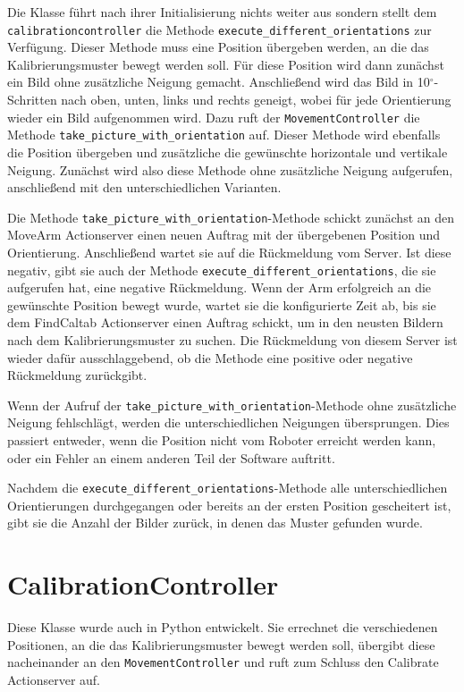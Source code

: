Die Klasse führt nach ihrer Initialisierung nichts weiter aus sondern stellt dem \texttt{calibrationcontroller} die Methode \texttt{execute\_different\_orientations} zur Verfügung. Dieser Methode muss eine Position übergeben werden, an die das Kalibrierungsmuster bewegt werden soll. Für diese Position wird dann zunächst ein Bild ohne zusätzliche Neigung gemacht. Anschließend wird das Bild in 10$^\circ$-Schritten nach oben, unten, links und rechts geneigt, wobei für jede Orientierung wieder ein Bild aufgenommen wird. Dazu ruft der \texttt{MovementController} die Methode \texttt{take\_picture\_with\_orientation} auf. Dieser Methode wird ebenfalls die Position übergeben und zusätzliche die gewünschte horizontale und vertikale Neigung. Zunächst wird also diese Methode ohne zusätzliche Neigung aufgerufen, anschließend mit den unterschiedlichen Varianten.

Die Methode \texttt{take\_picture\_with\_orientation}-Methode schickt zunächst an den MoveArm Actionserver einen neuen Auftrag mit der übergebenen Position und Orientierung. Anschließend wartet sie auf die Rückmeldung vom Server. Ist diese negativ, gibt sie auch der Methode \texttt{execute\_different\_orientations}, die sie aufgerufen hat, eine negative Rückmeldung. Wenn der Arm erfolgreich an die gewünschte Position bewegt wurde, wartet sie die konfigurierte Zeit ab, bis sie dem FindCaltab Actionserver einen Auftrag schickt, um in den neusten Bildern nach dem Kalibrierungsmuster zu suchen. Die Rückmeldung von diesem Server ist wieder dafür ausschlaggebend, ob die Methode eine positive oder negative Rückmeldung zurückgibt.

Wenn der Aufruf der \texttt{take\_picture\_with\_orientation}-Methode ohne zusätzliche Neigung fehlschlägt, werden die unterschiedlichen Neigungen übersprungen. Dies passiert entweder, wenn die Position nicht vom Roboter erreicht werden kann, oder ein Fehler an einem anderen Teil der Software auftritt.

Nachdem die \texttt{execute\_different\_orientations}-Methode alle unterschiedlichen Orientierungen durchgegangen oder bereits an der ersten Position gescheitert ist, gibt sie die Anzahl der Bilder zurück, in denen das Muster gefunden wurde.

\section{CalibrationController} %
\label{sec:calibrationcontroller_impl}
Diese Klasse wurde auch in Python entwickelt. Sie errechnet die verschiedenen Positionen, an die das Kalibrierungsmuster bewegt werden soll, übergibt diese nacheinander an den \texttt{MovementController} und ruft zum Schluss den Calibrate Actionserver auf.

